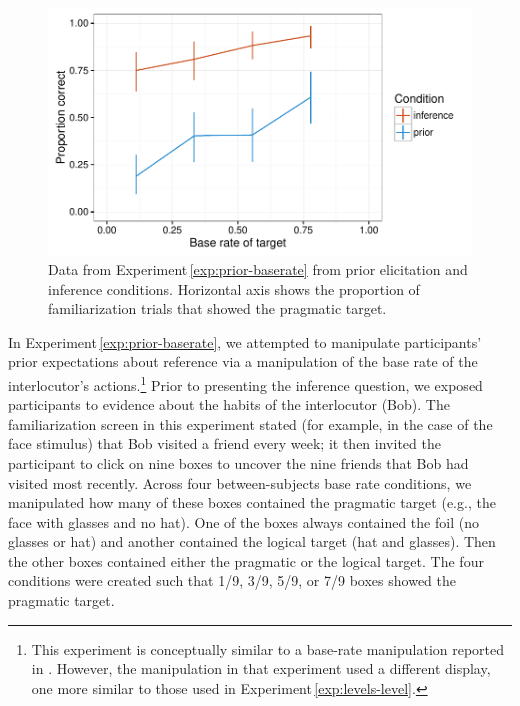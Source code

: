 \documentclass[man,noapacite]{apa2}
\newcounter{Experiment}
\newcommand{\exptref}[1]{Experiment\,\ref{#1}}
\begin{document}
\begin{figure}[t]
  \centering
  \includegraphics[width=5in]{../plots/2-prior-baserates.pdf}
  \caption{\label{fig:prior-baserate} Data from \exptref{exp:prior-baserate} from prior elicitation and inference conditions. Horizontal axis shows the proportion of familiarization trials that showed the pragmatic target.}
\end{figure}

In \exptref{exp:prior-baserate}, we attempted to manipulate participants' prior expectations about reference via a manipulation of the base rate of the interlocutor's actions.\footnote{This experiment is conceptually similar to a base-rate manipulation reported in . However, the manipulation in that experiment used a different display, one more similar to those used in \exptref{exp:levels-level}.} Prior to presenting the inference question, we exposed participants to evidence about the habits of the interlocutor (Bob). The familiarization screen in this experiment stated (for example, in the case of the face stimulus) that Bob visited a friend every week; it then invited the participant to click on nine boxes to uncover the nine friends that Bob had visited most recently. Across four between-subjects base rate conditions, we manipulated how many of these boxes contained the pragmatic target (e.g., the face with glasses and no hat). One of the boxes always contained the foil (no glasses or hat) and another contained the logical target (hat and glasses). Then the other boxes contained either the pragmatic or the logical target. The four conditions were created such that 1/9, 3/9, 5/9, or 7/9 boxes showed the pragmatic target.
\end{document}
